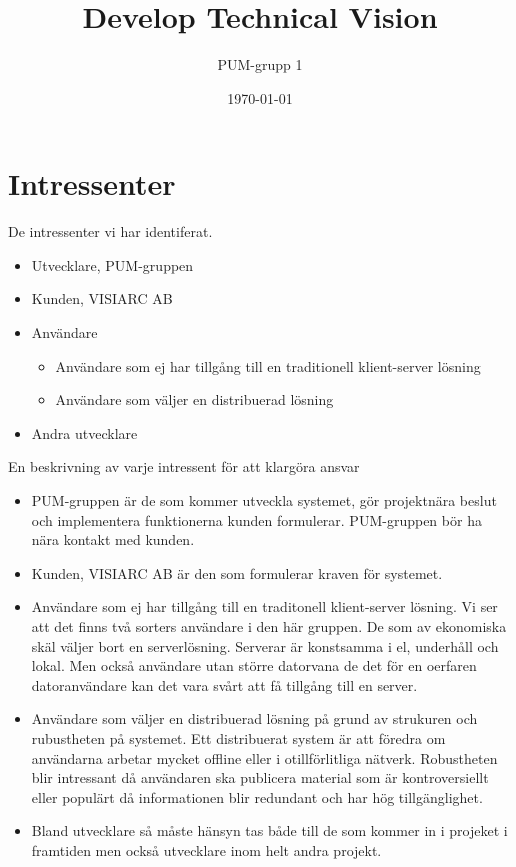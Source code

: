 

\ifpdf
\else
\fi

\title{Develop Technical Vision}
\author{PUM-grupp 1}
\date{\today}



\maketitle\thispagestyle{empty}
\newpage
\section{Intressenter}
De intressenter vi har identiferat.
\begin{itemize}
\item Utvecklare, PUM-gruppen
\item Kunden, VISIARC AB
\item Användare
\begin{itemize}
\item Användare som ej har tillgång till en traditionell klient-server lösning
\item Användare som väljer en distribuerad lösning
\end{itemize}
\item Andra utvecklare
\end{itemize}
En beskrivning av varje intressent för att klargöra ansvar  
\begin{itemize}
\item PUM-gruppen är de som kommer utveckla systemet, gör projektnära beslut och implementera funktionerna kunden formulerar.  PUM-gruppen bör ha nära kontakt med kunden.
\item Kunden, VISIARC AB är den som formulerar kraven för systemet. 
\item Användare som ej har tillgång till en traditonell klient-server lösning. Vi ser att det finns två sorters användare i den här gruppen. De som av ekonomiska skäl väljer bort en serverlösning. Serverar är konstsamma i el, underhåll och lokal. Men också användare utan större datorvana de det för en oerfaren datoranvändare kan det vara svårt att få tillgång till en server. 
\item Användare som väljer en distribuerad lösning på grund av strukuren och rubustheten på systemet. Ett distribuerat system är att föredra om användarna arbetar mycket offline eller i otillförlitliga nätverk. Robustheten blir intressant då användaren ska publicera material som är kontroversiellt eller populärt då informationen blir redundant och har hög tillgänglighet.
\item Bland utvecklare så måste hänsyn tas både till de som kommer in i projeket i framtiden men också utvecklare inom helt andra projekt.
\end{itemize}
